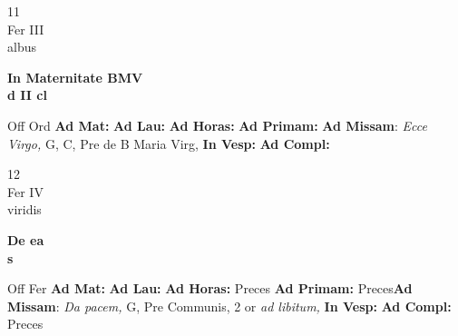 \documentclass[10pt, openany]{book}
\begin{document}
    \begin{center}
        \begin{minipage}{3.5in}
            \vspace{2em}
            \begin{minipage}{0.5in}
                {\Huge 11} \\
                {\normalsize Fer III} \\
                {\normalsize albus}
            \end{minipage}
            \begin{minipage}{3.0in}
                \textbf{ \large In Maternitate BMV \\
                \textnormal{\normalsize d II cl}} \\ 
            \end{minipage}
            \begin{justify}Off Ord
                \textbf{Ad Mat: }
                \textbf{Ad Lau: }
                \textbf{Ad Horas: }
                \textbf{Ad Primam: }\textbf{Ad Missam}: \textit{Ecce Virgo,} G, C, Pre de B Maria Virg,  
                \textbf{In Vesp: }
                \textbf{Ad Compl: }
            \end{justify}
        \end{minipage}
    \end{center}

    \begin{center}
        \begin{minipage}{3.5in}
            \vspace{2em}
            \begin{minipage}{0.5in}
                {\Huge 12} \\
                {\normalsize Fer IV} \\
                {\normalsize viridis}
            \end{minipage}
            \begin{minipage}{3.0in}
                \textbf{ \large De ea \\
                \textnormal{\normalsize s}} \\ 
            \end{minipage}
            \begin{justify}Off Fer
                \textbf{Ad Mat: }
                \textbf{Ad Lau: }
                \textbf{Ad Horas: }Preces
                \textbf{Ad Primam: }Preces\textbf{Ad Missam}: \textit{Da pacem,} G, Pre Communis, 2 or \textit{ad libitum,}  
                \textbf{In Vesp: }
                \textbf{Ad Compl: }Preces
            \end{justify}
        \end{minipage}
    \end{center}
\end{document}
